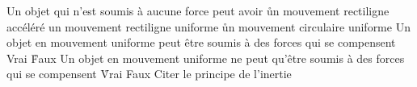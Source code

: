   \q
Un objet qui n'est soumis à aucune force peut avoir
\r
un mouvement rectiligne accéléré
\rv
un mouvement rectiligne uniforme
\r
un mouvement circulaire uniforme
\q
Un objet en mouvement uniforme peut être soumis à des forces qui se compensent
\rv
Vrai
\r
Faux
\q
Un objet en mouvement uniforme ne peut qu'être soumis à des forces qui se compensent
\r
Vrai
\rv
Faux
\q
Citer le principe de l'inertie


